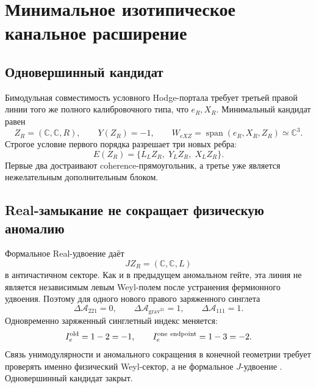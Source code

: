 \chapter{Минимальное изотипическое канальное расширение}
\label{ch:v8-baryon-c0-minimal-isotypic-channel-extension}

\section{Одновершинный кандидат}

Бимодульная совместимость условного Hodge-портала требует третьей правой
линии того же полного калибровочного типа, что $e_R,X_R$. Минимальный
кандидат равен
\begin{equation}
 Z_R=(\mathbb C,\mathbb C,R),
 \qquad Y(Z_R)=-1,
 \qquad
 W_{eXZ}=\operatorname{span}(e_R,X_R,Z_R)\simeq\mathbb C^3.
 \label{eq:v8-isotypic-extension-single-endpoint}
\end{equation}
Строгое условие первого порядка разрешает три новых ребра:
\begin{equation}
 E(Z_R)=\{L_LZ_R,\;Y_LZ_R,\;X_LZ_R\}.
 \label{eq:v8-isotypic-extension-single-edges}
\end{equation}
Первые два достраивают coherence-прямоугольник, а третье уже является
нежелательным дополнительным блоком.

\section{Real-замыкание не сокращает физическую аномалию}

Формальное Real-удвоение даёт
\begin{equation}
 JZ_R=(\mathbb C,\mathbb C,L)
 \label{eq:v8-isotypic-extension-real-image}
\end{equation}
в античастичном секторе. Как и в предыдущем аномальном гейте, эта линия не
является независимым левым Weyl-полем после устранения фермионного удвоения.
Поэтому для одного нового правого заряженного синглета
\begin{equation}
 \Delta\mathcal A_{221}=0,
 \qquad
 \Delta\mathcal A_{\mathrm{grav}^21}=1,
 \qquad
 \Delta\mathcal A_{111}=1.
 \label{eq:v8-isotypic-extension-single-anomalies}
\end{equation}
Одновременно заряженный синглетный индекс меняется:
\begin{equation}
 I_e^{\rm old}=1-2=-1,
 \qquad
 I_e^{\rm one\ endpoint}=1-3=-2.
 \label{eq:v8-isotypic-extension-single-index}
\end{equation}
Связь унимодулярности и аномального сокращения в конечной геометрии требует
проверять именно физический Weyl-сектор, а не формальное $J$-удвоение
\cite{v8-isotypic-extension-alvarez}. Одновершинный кандидат закрыт.

